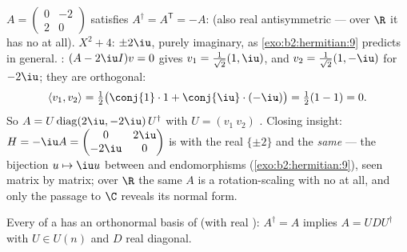 \begin{example}\label{ex:b2:hermitian:skewexample}
$A = \begin{pmatrix} 0 & -2\\ 2 & 0\end{pmatrix}$ satisfies
$A^\dagger = A^{\mathsf T} = -A$:  (also real
antisymmetric --- over $\R$ it has no  at all).
 $X^2 + 4$:  $\pm2\iu$,
purely imaginary, as \cref{exo:b2:hermitian:9} predicts in
general. : $(A - 2\iu I)v = 0$ gives $v_1 =
\frac{1}{\sqrt2}(1, \iu)$, and $v_2 = \frac{1}{\sqrt2}(1,
-\iu)$ for $-2\iu$; they are orthogonal:
\[
\langle v_1, v_2\rangle
= \tfrac12\bigl(\conj{1}\cdot1 +
\conj{\iu}\cdot(-\iu)\bigr)
= \tfrac12(1 - 1) = 0 .
\]
So $A = U\operatorname{diag}(2\iu, -2\iu)\,U^\dagger$ with $U =
(v_1\ v_2)$ . Closing insight: $H = -\iu A =
\begin{pmatrix} 0 & 2\iu\\ -2\iu & 0\end{pmatrix}$ is 
with the real  $\{\pm2\}$ and the \emph{same}
 --- the bijection $u \mapsto \iu u$ between
 and  endomorphisms
(\cref{exo:b2:hermitian:9}), seen matrix by matrix; over $\R$
the same $A$ is a rotation-scaling with no  at
all, and only the passage to $\C$ reveals its normal form.
\end{example}

\begin{theorem}\label{thm:b2:hermitian:spectral}
Every  of a  has an orthonormal
basis of  (with real ): $A^\dagger = A$
implies $A = U D U^{\dagger}$ with $U \in U(n)$ and $D$ real
diagonal.
\end{theorem}

